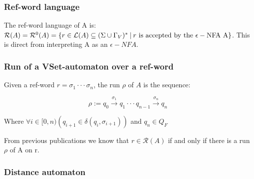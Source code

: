 \documentclass{article}
\newcommand{\set}[1]{\left\{#1\right\}}
\newcommand{\paren}[1]{\left(#1\right)}
\newcommand{\st}{\ \vline \ }
\newcommand{\lra}{\longrightarrow}
\begin{document}



\subsubsection*{Ref-word language}
The ref-word language of A is: $\mathcal{R}(A) = \mathcal{R}^0(A)
= \set{r \in \mathcal{L}(A)\subseteq(\Sigma\cup\Gamma_V)^*\st
r\mathrm{\ is\ accepted\ by\ the\ \epsilon-NFA\ A}}$. This is direct
from interpreting A as an $\epsilon-NFA$.

\subsubsection*{Run of a VSet-automaton over a ref-word}

Given a ref-word $r = \sigma_1\cdot\cdot\cdot\sigma_n$, the run
$\rho$ of $A$ is the sequence:

\begin{equation}
    \rho:=q_0\overset{\sigma_1}{\lra}q_1 \cdot\cdot\cdot q_{n-1}
    \overset{\sigma_n}{\lra}q_n
\end{equation}

Where $\forall i \in [0,n)\paren{q_{i+1} \in \delta(q_i,\sigma_{i+1})}$
and $q_n\in Q_F$

From previous publications we know that $r \in \mathcal{R}(A)$ if
and only if there is a run $\rho$ of A on r.

\newpage
\subsubsection*{Distance automaton}
\end{document}
